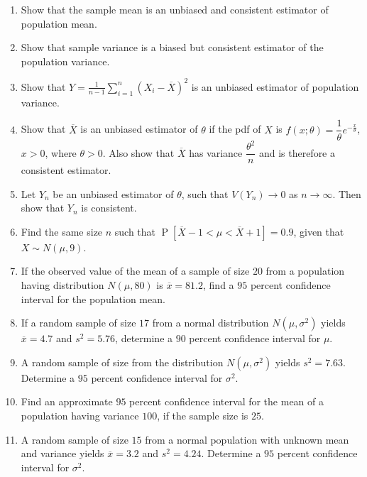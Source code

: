 \documentclass[svgnames]{amsart}
\DeclareMathOperator{\Prob}{P}
\begin{document}
\begin{enumerate}[leftmargin=*, itemsep=2mm]
\item Show that the sample mean is an unbiased and consistent estimator of population mean.

\item Show that sample variance is a biased but consistent estimator of the population variance.

\item Show that $Y = \frac{1}{n - 1} \sum_{i = 1}^n (X_i - \overline X)^2$ is an unbiased estimator of population variance.

\item Show that $\overline X$ is an unbiased estimator of $\theta$ if the pdf of $X$ is $f(x; \theta) = \dfrac 1 \theta e^{-\frac x \theta}$, $x > 0$, where $\theta > 0$. Also show that $\overline X$ has variance $\dfrac {\theta^2} n$ and is therefore a consistent estimator.

\item Let $Y_n$ be an unbiased estimator of $\theta$, such that $V(Y_n) \to 0$ as $n \to \infty$. Then show that $Y_n$ is consistent.

\item Find the same size $n$ such that $\Prob[\overline X - 1 < \mu < \overline X + 1] = 0.9$, given that $X \sim N(\mu, 9)$.

\item If the observed value of the mean of a sample of size $20$ from a population having distribution $N(\mu, 80)$ is $\overline x = 81.2$, find a $95$ percent confidence interval for the population mean.

\item If a random sample of size $17$ from a normal distribution $N(\mu, \sigma^2)$ yields $\overline x = 4.7$ and $s^2 = 5.76$, determine a $90$ percent confidence interval for $\mu$.

\item A random sample of size from the distribution $N(\mu, \sigma^2)$ yields $s^2 = 7.63$. Determine a $95$ percent confidence interval for $\sigma^2$.

\item Find an approximate $95$ percent confidence interval for the mean of a population having variance $100$, if the sample size is $25$.

\item A random sample of size $15$ from a normal population with unknown mean and variance yields $\overline x = 3.2$ and $s^2 = 4.24$. Determine a $95$ percent confidence interval for $\sigma^2$.


\end{enumerate}
\end{document}
